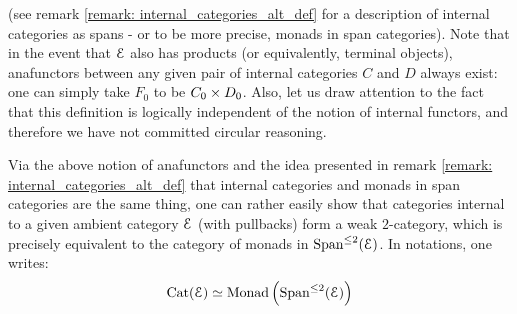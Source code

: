 \begin{definition}
\begin{enumerate}
$$                                    $$
                                (see remark \ref{remark: internal_categories_alt_def} for a description of internal categories as spans - or to be more precise, monads in span categories). Note that in the event that $\mathcal{E}$ also has products (or equivalently, terminal objects), anafunctors between any given pair of internal categories $C$ and $D$ always exist: one can simply take $F_0$ to be $C_0 \x D_0$. Also, let us draw attention to the fact that this definition is logically independent of the notion of internal functors, and therefore we have not committed circular reasoning.
                            \end{enumerate}
                    \end{definition}
                    \begin{remark} \label{remark: categories_of_internal_categories}
                        Via the above notion of anafunctors and the idea presented in remark \ref{remark: internal_categories_alt_def} that internal categories and monads in span categories are the same thing, one can rather easily show that categories internal to a given ambient category $\mathcal{E}$ (with pullbacks) form a weak $2$-category, which is precisely equivalent to the category of monads in $\mathrm{Span}^{\leq 2}(\mathcal{E})$. In notations, one writes:
                            $$\mathrm{Cat}(\mathcal{E}) \simeq \mathrm{Monad}\left(\mathrm{Span}^{\leq 2}(\mathcal{E})\right)$$
                    \end{remark}
